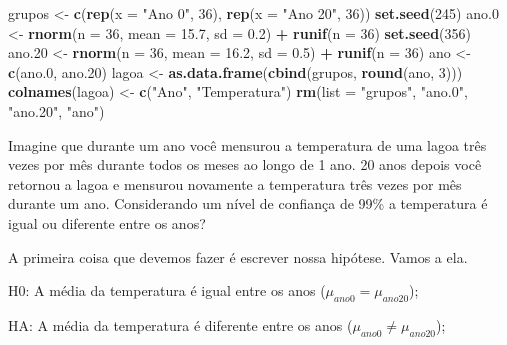 \documentclass[14pt,titlepage, oneside, openany, a4paper]{book}
\newenvironment{Shaded}{\begin{snugshade}}{\end{snugshade}}
\newcommand{\DataTypeTok}[1]{\textcolor[rgb]{0.13,0.29,0.53}{#1}}
\newcommand{\DecValTok}[1]{\textcolor[rgb]{0.00,0.00,0.81}{#1}}
\newcommand{\FloatTok}[1]{\textcolor[rgb]{0.00,0.00,0.81}{#1}}
\newcommand{\KeywordTok}[1]{\textcolor[rgb]{0.13,0.29,0.53}{\textbf{#1}}}
\newcommand{\NormalTok}[1]{#1}
\newcommand{\OperatorTok}[1]{\textcolor[rgb]{0.81,0.36,0.00}{\textbf{#1}}}
\newcommand{\StringTok}[1]{\textcolor[rgb]{0.31,0.60,0.02}{#1}}
\begin{document}
\begin{Shaded}
\begin{Highlighting}[]
\NormalTok{grupos <-}\StringTok{ }\KeywordTok{c}\NormalTok{(}\KeywordTok{rep}\NormalTok{(}\DataTypeTok{x =} \StringTok{"Ano 0"}\NormalTok{, }\DecValTok{36}\NormalTok{), }\KeywordTok{rep}\NormalTok{(}\DataTypeTok{x =} \StringTok{"Ano 20"}\NormalTok{, }\DecValTok{36}\NormalTok{))}
\KeywordTok{set.seed}\NormalTok{(}\DecValTok{245}\NormalTok{)}
\NormalTok{ano}\FloatTok{.0}\NormalTok{ <-}\StringTok{ }\KeywordTok{rnorm}\NormalTok{(}\DataTypeTok{n =} \DecValTok{36}\NormalTok{, }\DataTypeTok{mean =} \FloatTok{15.7}\NormalTok{, }\DataTypeTok{sd =} \FloatTok{0.2}\NormalTok{) }\OperatorTok{+}\StringTok{ }\KeywordTok{runif}\NormalTok{(}\DataTypeTok{n =} \DecValTok{36}\NormalTok{)}
\KeywordTok{set.seed}\NormalTok{(}\DecValTok{356}\NormalTok{)}
\NormalTok{ano}\FloatTok{.20}\NormalTok{ <-}\StringTok{ }\KeywordTok{rnorm}\NormalTok{(}\DataTypeTok{n =} \DecValTok{36}\NormalTok{, }\DataTypeTok{mean =} \FloatTok{16.2}\NormalTok{, }\DataTypeTok{sd =} \FloatTok{0.5}\NormalTok{) }\OperatorTok{+}\StringTok{ }\KeywordTok{runif}\NormalTok{(}\DataTypeTok{n =} \DecValTok{36}\NormalTok{)}
\NormalTok{ano <-}\StringTok{ }\KeywordTok{c}\NormalTok{(ano}\FloatTok{.0}\NormalTok{, ano}\FloatTok{.20}\NormalTok{)}
\NormalTok{lagoa <-}\StringTok{ }\KeywordTok{as.data.frame}\NormalTok{(}\KeywordTok{cbind}\NormalTok{(grupos, }\KeywordTok{round}\NormalTok{(ano, }\DecValTok{3}\NormalTok{)))}
\KeywordTok{colnames}\NormalTok{(lagoa) <-}\StringTok{ }\KeywordTok{c}\NormalTok{(}\StringTok{"Ano"}\NormalTok{, }\StringTok{"Temperatura"}\NormalTok{)}
\KeywordTok{rm}\NormalTok{(}\DataTypeTok{list =} \StringTok{"grupos"}\NormalTok{, }\StringTok{"ano.0"}\NormalTok{, }\StringTok{"ano.20"}\NormalTok{, }\StringTok{"ano"}\NormalTok{)}
\end{Highlighting}
\end{Shaded}

Imagine que durante um ano você mensurou a temperatura de uma lagoa três vezes por mês durante todos os meses ao longo de 1 ano. 20 anos depois você retornou a lagoa e mensurou novamente a temperatura três vezes por mês durante um ano. Considerando um nível de confiança de 99\% a temperatura é igual ou diferente entre os anos?

A primeira coisa que devemos fazer é escrever nossa hipótese. Vamos a ela.

H0: A média da temperatura é igual entre os anos (\(\mu_{ano0} = \mu_{ano 20}\));

HA: A média da temperatura é diferente entre os anos (\(\mu_{ano0} \neq \mu_{ano 20}\));
\end{document}
